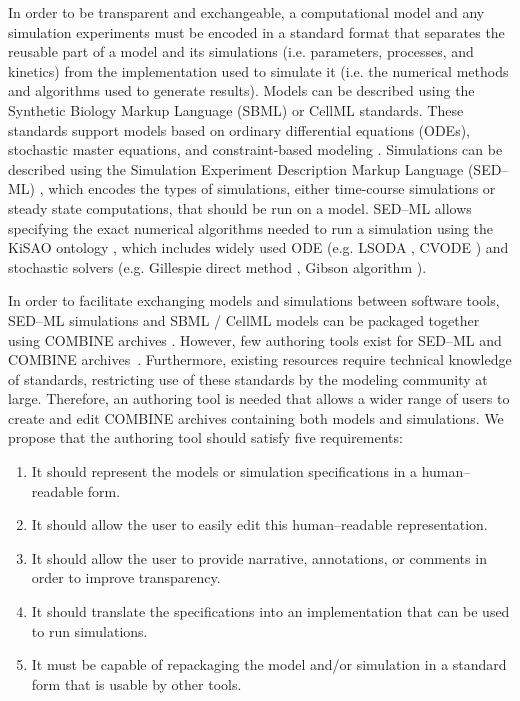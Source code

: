 \documentclass[10pt,letterpaper]{article}
\begin{document}
In order to be transparent and exchangeable, a computational model and any simulation experiments must be encoded in a standard format that separates the reusable part of a model and its simulations (i.e. parameters, processes, and kinetics) from the implementation used to simulate it (i.e. the numerical methods and algorithms used to generate results). Models can be described using the Synthetic Biology Markup Language (SBML) \cite{hucka2003systems} or CellML \cite{cuellar2003overview} standards. These standards support models based on ordinary differential equations (ODEs), stochastic master equations, and constraint-based modeling \cite{sbmlfbc}. Simulations can be described using the Simulation Experiment Description Markup Language (SED--ML) \cite{waltemath2011reproducible}, which encodes the types of simulations, either time-course simulations or steady state computations, that should be run on a model. SED--ML allows specifying the exact numerical algorithms needed to run a simulation using the KiSAO ontology \cite{courtot2011controlled}, which includes widely used ODE (e.g. LSODA \cite{petzold1983automatic,hindmarsh1983odepack}, CVODE \cite{cohen1996cvode}) and stochastic solvers (e.g. Gillespie direct method \cite{gillespie1977exact}, Gibson algorithm \cite{gibson2000efficient}).


In order to facilitate exchanging models and simulations between software tools, SED--ML simulations and SBML / CellML models can be packaged together using COMBINE archives \cite{bergmann2014combine}. However, few authoring tools exist for SED--ML and COMBINE archives~\cite{bergmann2017sed,scharm2014combinearchiveweb}. Furthermore, existing resources require technical knowledge of standards, restricting use of these standards by the modeling community at large. Therefore, an authoring tool is needed that allows a wider range of users to create and edit COMBINE archives containing both models and simulations. We propose that the authoring tool should satisfy five requirements:

\begin{enumerate}
\item It should represent the models or simulation specifications in a human--readable form.
\item It should allow the user to easily edit this human--readable representation.
\item It should allow the user to provide narrative, annotations, or comments in order to improve transparency.
\item It should translate the specifications into an implementation that can be used to run simulations.
\item It must be capable of repackaging the model and/or simulation in a standard form that is usable by other tools.
\end{enumerate}
\end{document}
